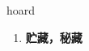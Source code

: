 
\begin{frame}
{\huge hoard}
\begin{center}
\begin{enumerate}\Large
  \item \textbf{贮藏，秘藏}
\end{enumerate}
\end{center}
\end{frame}
